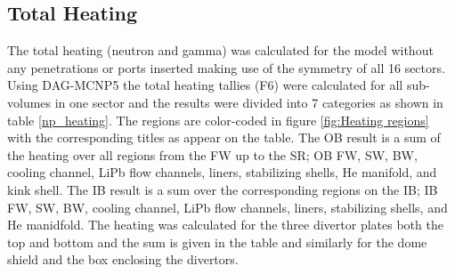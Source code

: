 \documentclass[12pt, letterpaper]{elsarticle}
\begin{document}
\subsection{Total Heating}
The total heating (neutron and gamma) was calculated for the model without any penetrations or ports inserted making use of the symmetry of all 16 sectors. Using DAG-MCNP5 the total heating tallies (F6) were calculated for all sub-volumes in one sector and the results were divided into 7 categories as shown in table \ref{np_heating}. The regions are color-coded in figure \ref{fig:Heating regions} with the corresponding titles as appear on the table. The OB result is a sum of the heating over all regions from the FW up to the SR; OB FW, SW, BW, cooling channel, LiPb flow channels, liners, stabilizing shells, He manifold, and kink shell. The IB result is a sum over the corresponding regions on the IB; IB FW, SW, BW, cooling channel, LiPb flow channels, liners, stabilizing shells, and He manidfold. The heating was calculated for the three divertor plates both the top and bottom and the sum is given in the table and similarly for the dome shield and the box enclosing the divertors. \vspace{5mm}
\end{document}
